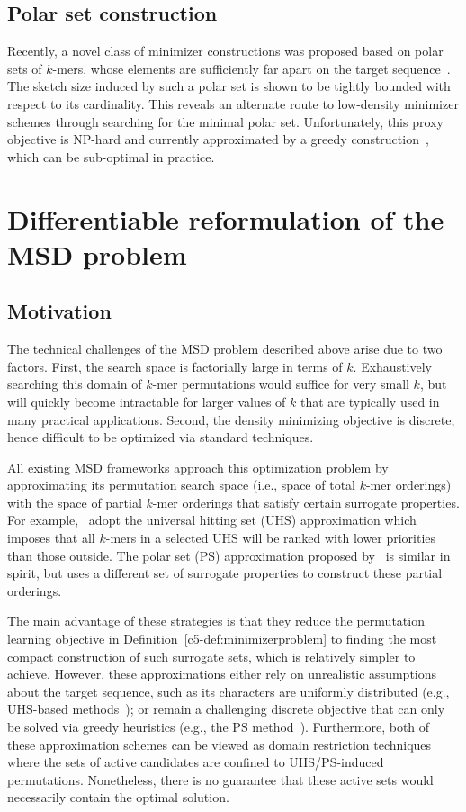 \subsection{Polar set construction} Recently, a novel class of minimizer constructions was proposed based on polar sets of $k$-mers, whose elements are sufficiently far apart on the target sequence~\citep{zheng21}. The sketch size induced by such a polar set is shown to be tightly bounded with respect to its cardinality. This reveals an alternate route to low-density minimizer schemes through searching for the minimal polar set. Unfortunately, this proxy objective is NP-hard and currently approximated by a greedy construction~\citep{zheng21}, which can be sub-optimal in practice.

\section{Differentiable reformulation of the MSD problem}
\subsection{Motivation}
The technical challenges of the MSD problem described above arise due to two factors. First, the search space is factorially large in terms of $k$. Exhaustively searching this domain of $k$-mer permutations would suffice for very small $k$, but will quickly become intractable for larger values of $k$ that are typically used in many practical applications. Second, the density minimizing objective is discrete, hence difficult to be optimized via standard techniques. 

All existing MSD frameworks approach this optimization problem by approximating its permutation search space (i.e., space of total $k$-mer orderings) with the space of partial $k$-mer orderings that satisfy certain surrogate properties. For example,~\citet{marcais17,marcais18,ekim20pasha,zheng20miniception} adopt the universal hitting set (UHS) approximation which imposes that all $k$-mers in a selected UHS will be ranked with lower priorities than those outside. The polar set (PS) approximation proposed by~\citet{zheng21} is similar in spirit, but uses a different set of surrogate properties to construct these partial orderings.

The main advantage of these strategies is that they reduce the permutation learning objective in Definition~\ref{c5-def:minimizerproblem} to finding the most compact construction of such surrogate sets, which is relatively simpler to achieve. However, these approximations either rely on unrealistic assumptions about the target sequence, such as its characters are uniformly distributed (e.g., UHS-based methods~\cite{marcais17,marcais18,ekim20pasha,zheng20miniception}); or remain a challenging discrete objective that can only be solved via greedy heuristics (e.g., the PS method~\cite{zheng21}). Furthermore, both of these approximation schemes can be viewed as domain restriction techniques where the sets of active candidates are confined to UHS/PS-induced permutations. Nonetheless, there is no guarantee that these active sets would necessarily contain the optimal solution.

